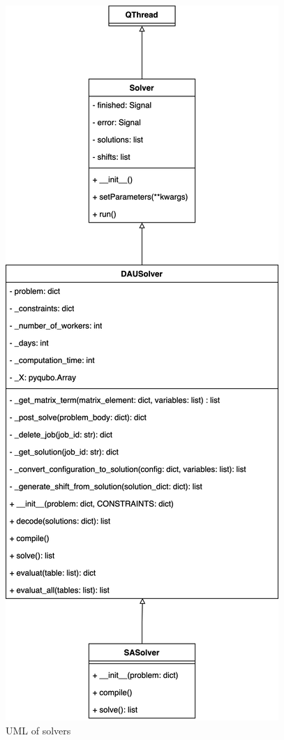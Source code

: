 \documentclass[11pt, oneside]{article}   	%
\begin{document}
\begin{figure}[h]
\centering
\includegraphics[scale=0.08]{solvers}
\caption{UML of solvers}
\label{umlsolvers}
\end{figure}
\end{document}
